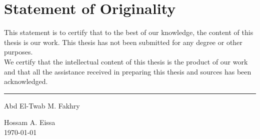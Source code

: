 \chapter*{Statement of Originality}

This statement is to certify that to the best of our knowledge, the content of this thesis is our work. This thesis has not been submitted for any degree or other purposes. \\[16pt]
We certify that the intellectual content of this thesis is the product of our work and that all the assistance received in preparing this thesis and sources has been acknowledged. \\[48pt]

\begin{flushright}
  \par\noindent\rule{0.30\textwidth}{0.4pt}\par
  Abd El-Twab M. Fakhry\par
  Hossam A. Eissa \\[8pt]
  \today
\end{flushright}
